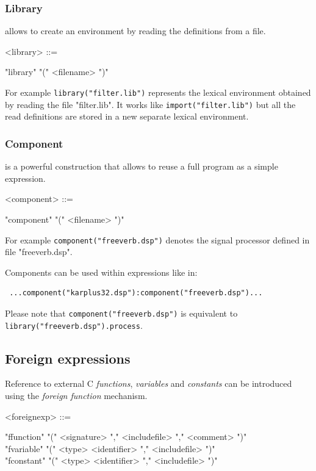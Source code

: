 \documentclass[a4paper]{book}
\begin{document}
\subsubsection{Library} allows to create an environment by reading the definitions from a file.

\begin{grammar}
  <library> ::= 
  \begin{syntdiag}
      "library" "(" <filename> ")"
  \end{syntdiag}
\end{grammar}

For example \lstinline'library("filter.lib")' represents the lexical environment 
obtained by reading the file "filter.lib". It works like \lstinline'import("filter.lib")' but all the read definitions are stored in a new separate lexical environment.


\subsubsection{Component} is a powerful construction that allows to reuse a full \faust program as a simple expression.

\begin{grammar}
  <component> ::= 
  \begin{syntdiag}
    "component" "(" <filename> ")"
  \end{syntdiag}
\end{grammar}

 For example \lstinline'component("freeverb.dsp")' denotes the signal processor defined in file "freeverb.dsp". 
 
 Components can be used within expressions like in: 
 \begin{lstlisting}
 ...component("karplus32.dsp"):component("freeverb.dsp")... 
 \end{lstlisting}
 
 Please note that \lstinline'component("freeverb.dsp")' is equivalent to \lstinline'library("freeverb.dsp").process'.


\subsection{Foreign expressions}

Reference to external C \textit{functions}, \textit{variables} and \textit{constants} can be introduced using the \textit{foreign function} mechanism.

\begin{grammar}
  <foreignexp> ::= 
  \begin{syntdiag}
    \begin{stack}
      "ffunction" "(" <signature> "," <includefile> "," <comment> ")" \\
      "fvariable" "(" <type> <identifier> "," <includefile> ")" \\
      "fconstant" "(" <type> <identifier> "," <includefile> ")" 
    \end{stack}
  \end{syntdiag}
\end{grammar}
\end{document}
